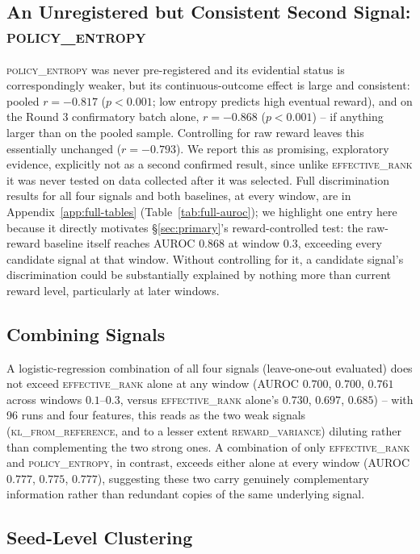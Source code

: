 \documentclass{article}
\newcommand{\erank}{\textsc{effective\_rank}}
\newcommand{\pentropy}{\textsc{policy\_entropy}}
\newcommand{\klref}{\textsc{kl\_from\_reference}}
\newcommand{\rvar}{\textsc{reward\_variance}}
\begin{document}
\subsection{An Unregistered but Consistent Second Signal: \pentropy}
\label{sec:policyentropy}

\pentropy{} was never pre-registered and its evidential status is
correspondingly weaker, but its continuous-outcome effect is large and
consistent: pooled $r=-0.817$ ($p<0.001$; low entropy predicts high eventual
reward), and on the Round 3 confirmatory batch alone, $r=-0.868$ ($p<0.001$) --
if anything larger than on the pooled sample. Controlling for raw reward
leaves this essentially unchanged ($r=-0.793$). We report this as promising,
exploratory evidence, explicitly not as a second confirmed result, since
unlike \erank{} it was never tested on data collected after it was selected.
Full discrimination results for all four signals and both baselines, at every
window, are in Appendix~\ref{app:full-tables} (Table~\ref{tab:full-auroc}); we
highlight one entry here because it directly motivates \S\ref{sec:primary}'s
reward-controlled test: the raw-reward baseline itself reaches AUROC $0.868$
at window $0.3$, exceeding every candidate signal at that window. Without
controlling for it, a candidate signal's discrimination could be substantially
explained by nothing more than current reward level, particularly at later
windows.

\subsection{Combining Signals}
\label{sec:combining}

A logistic-regression combination of all four signals (leave-one-out
evaluated) does not exceed \erank{} alone at any window (AUROC $0.700$,
$0.700$, $0.761$ across windows $0.1$--$0.3$, versus \erank{} alone's $0.730$,
$0.697$, $0.685$) -- with 96 runs and four features, this reads as the two
weak signals (\klref, and to a lesser extent \rvar) diluting rather than
complementing the two strong ones. A combination of only \erank{} and
\pentropy{}, in contrast, exceeds either alone at every window (AUROC $0.777$,
$0.775$, $0.777$), suggesting these two carry genuinely complementary
information rather than redundant copies of the same underlying signal.

\subsection{Seed-Level Clustering}
\label{sec:seedclustering}
\end{document}
